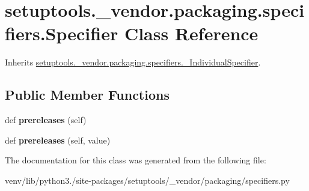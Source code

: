 \hypertarget{classsetuptools_1_1__vendor_1_1packaging_1_1specifiers_1_1_specifier}{}\section{setuptools.\+\_\+vendor.\+packaging.\+specifiers.\+Specifier Class Reference}
\label{classsetuptools_1_1__vendor_1_1packaging_1_1specifiers_1_1_specifier}


Inherits \hyperlink{classsetuptools_1_1__vendor_1_1packaging_1_1specifiers_1_1___individual_specifier}{setuptools.\+\_\+vendor.\+packaging.\+specifiers.\+\_\+\+Individual\+Specifier}.

\subsection*{Public Member Functions}
\begin{DoxyCompactItemize}
\item 
\mbox{\label{classsetuptools_1_1__vendor_1_1packaging_1_1specifiers_1_1_specifier_a2aba0f7db7ea169989e656cfead54e9b}} 
def {\bfseries prereleases} (self)
\item 
\mbox{\label{classsetuptools_1_1__vendor_1_1packaging_1_1specifiers_1_1_specifier_a6ba68d7e24800548e4ce987f0b05e174}} 
def {\bfseries prereleases} (self, value)
\end{DoxyCompactItemize}


The documentation for this class was generated from the following file\+:\begin{DoxyCompactItemize}
\item 
venv/lib/python3./site-\/packages/setuptools/\+\_\+vendor/packaging/specifiers.\+py\end{DoxyCompactItemize}
